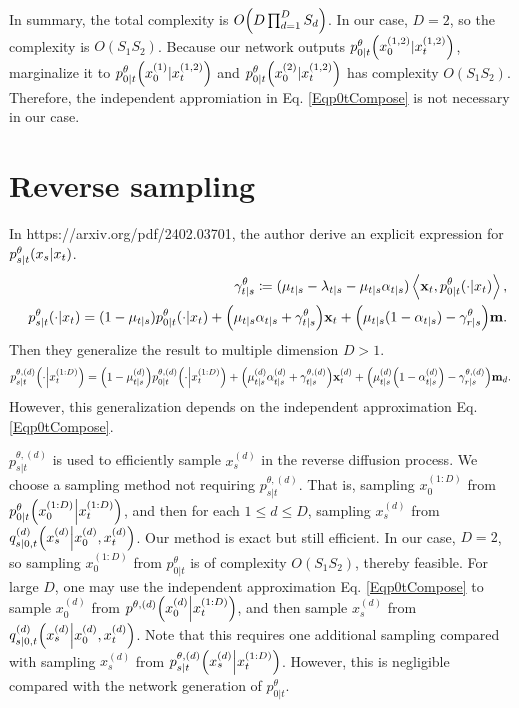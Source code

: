 \documentclass[10pt]{article}
\begin{document}
In summary, the total complexity is $O\qty(D\prod_{d=1}^D S_d)$. In our case, $D=2$, so the complexity is $O(S_1S_2)$. Because our network outputs $p^\theta_{0|t}\qty(x^{(1,2)}_0|x^{(1,2)}_t)$, marginalize it to $p^\theta_{0|t}\qty(x^{(1)}_0|x^{(1,2)}_t)$ and $p^\theta_{0|t}\qty(x^{(2)}_0|x^{(1,2)}_t)$ has complexity $O(S_1S_2)$. Therefore, the independent appromiation in Eq. \eqref{Eqp0tCompose} is not necessary in our case.

\section{Reverse sampling}

In https://arxiv.org/pdf/2402.03701, the author derive an explicit expression for $p^\theta_{s|t}\qty(x_s|x_t)$.
\begin{eqnarray*}
  &&\gamma^\theta_{t|s}\coloneqq (\mu_{t|s} - \lambda_{t|s} - \mu_{t|s}\alpha_{t|s})\left\langle \mathbf{x}_t, p^\theta_{0|t}(\cdot|x_t)\right\rangle,\\
  &&p^\theta_{s|t}\qty(\cdot|x_t)=(1-\mu_{t|s})p^\theta_{0|t}(\cdot|x_t) + \qty(\mu_{t|s}\alpha_{t|s} + \gamma^\theta_{t|s})\mathbf{x}_t + \qty(\mu_{t|s}(1-\alpha_{t|s})-\gamma^\theta_{r|s})\mathbf{m}.
\end{eqnarray*}
Then they generalize the result to multiple dimension $D>1$.
\begin{eqnarray*}
  p^{\theta,(d)}_{s|t}\qty(\cdot\middle|x^{(1:D)}_t)=\qty(1-\mu^{(d)}_{t|s})p^{\theta,(d)}_{0|t}\qty(\cdot\middle|x^{(1:D)}_t) + \qty(\mu^{(d)}_{t|s}\alpha^{(d)}_{t|s} + \gamma^{\theta,(d)}_{t|s})\mathbf{x}^{(d)}_t + \qty(\mu^{(d)}_{t|s}\qty(1-\alpha^{(d)}_{t|s})-\gamma^{\theta,(d)}_{r|s})\mathbf{m}_d.
\end{eqnarray*}
However, this generalization depends on the independent approximation Eq. \eqref{Eqp0tCompose}.

$p^{\theta,(d)}_{s|t}$ is used to efficiently sample $x^{(d)}_s$ in the reverse diffusion process. We choose a sampling method not requiring $p^{\theta,(d)}_{s|t}$. That is, sampling $x^{(1:D)}_0$ from $p^\theta_{0|t}\qty(x^{(1:D)}_0\middle|x^{(1:D)}_t)$, and then for each $1\le d\le D$, sampling $x^{(d)}_s$ from $q^{(d)}_{s|0,t}\qty(x^{(d)}_s\middle|x^{(d)}_0,x^{(d)}_t)$. Our method is exact but still efficient. In our case, $D=2$, so sampling $x^{(1:D)}_0$ from $p^\theta_{0|t}$ is of complexity $O(S_1S_2)$, thereby feasible. For large $D$, one may use the independent approximation Eq. \eqref{Eqp0tCompose} to sample $x^{(d)}_0$ from $p^{\theta,(d)}\qty(x^{(d)}_0\middle|x^{(1:D)}_t)$, and then sample $x^{(d)}_s$ from $q^{(d)}_{s|0,t}\qty(x^{(d)}_s\middle|x^{(d)}_0,x^{(d)}_t)$. Note that this requires one additional sampling compared with sampling $x^{(d)}_s$ from $p^{\theta,(d)}_{s|t}\qty(x^{(d)}_s\middle|x^{(1:D)}_t)$. However, this is negligible compared with the network generation of $p^\theta_{0|t}$.
\end{document}
